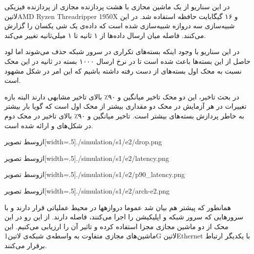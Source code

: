 در این سناریو از یک ماشین محازی با هشت پردازنده مجازی از پردازنده فیزیکی
‌لاتین{AMD Ryzen Threadripper 1950X}
و ۱۶ گیگابایت حافظه استفاده شد.
در این شبیه‌سازی سه دروازه شبیه‌سازی شده است که داده‌ی یک شی یکسان را گزارش می‌کنند. فاصله میان ارسال داده‌ها از ۱ ثانیه تا ۱ میلی‌ثانیه تغییر می‌کند.

در این سناریو با وجود اینکه بسته‌های تکراری در سرور شبکه حذف می‌شوند اما لود حاصل از این بسته‌ها باعث شده است تا در نرخ ارسال ۱۰۰۰ بسته در ثانیه
در این محک نسبت به محک اول بسته‌های از دست رفته داشته باشیم که این امر در شکل 
مشهود است.

در بحث تاخیر، این دو محک تاخیر میانگین و ۹۰٪ بالای تاخیر مشابهی دارند البته بازه تغییرات در هر آزمایش در محک دو مقداری بیشتر از محک اول است
که گویا بار بیشتر به خاطر پردازش بسته‌های بیشتر است. تاخیر میانگین و ۹۰٪ بالای تاخیر در محک دوم در شکل‌های 
و 
ارائه شده است.

‌ازوسط
‌تصویر[width=.5\textwidth]{./simulation/s1/e2/drop.png}

‌ازوسط
‌تصویر[width=.5\textwidth]{./simulation/s1/e2/latency.png}

‌ازوسط
‌تصویر[width=.5\textwidth]{./simulation/s1/e2/p90_latency.png}

‌ازوسط
‌تصویر[width=.5\textwidth]{./simulation/s1/e2/arch-e2.png}



همانطور که پیشتر هم بیان شد عموما دروازهها در محیط عملیاتی قرار دارند و با سرورهایی که سرور شبکه
و اپلیکیشن را اجرا می‌کنند، فاصله دارند. از این رو در این محک از دو ماشین مجازی مجزا استفاده کرده و تاثیر آن را ارزیابی می‌کنیم.
این ماشین‌های مجازی متفاوت به واسطه‌ی شبکه‌ی ‌لاتین{1G} ‌لاتین{Ethernet} با یکدیگر ارتباط برقرار می‌کنند.

